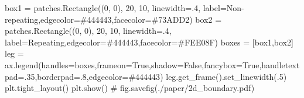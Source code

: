 \documentclass[
  letterpaper,
  DIV=11,
  numbers=noendperiod]{scrartcl}
\newenvironment{Shaded}{\begin{snugshade}}{\end{snugshade}}
\newcommand{\CommentTok}[1]{\textcolor[rgb]{0.37,0.37,0.37}{#1}}
\newcommand{\DecValTok}[1]{\textcolor[rgb]{0.68,0.00,0.00}{#1}}
\newcommand{\FloatTok}[1]{\textcolor[rgb]{0.68,0.00,0.00}{#1}}
\newcommand{\NormalTok}[1]{\textcolor[rgb]{0.00,0.23,0.31}{#1}}
\newcommand{\OperatorTok}[1]{\textcolor[rgb]{0.37,0.37,0.37}{#1}}
\newcommand{\StringTok}[1]{\textcolor[rgb]{0.13,0.47,0.30}{#1}}
\newcommand{\VariableTok}[1]{\textcolor[rgb]{0.07,0.07,0.07}{#1}}
\begin{document}
\begin{Shaded}
\begin{Highlighting}[]
\NormalTok{box1 }\OperatorTok{=}\NormalTok{ patches.Rectangle((}\DecValTok{0}\NormalTok{, }\DecValTok{0}\NormalTok{), }\DecValTok{20}\NormalTok{, }\DecValTok{10}\NormalTok{, linewidth}\OperatorTok{=}\FloatTok{.4}\NormalTok{, label}\OperatorTok{=}\StringTok{\textquotesingle{}Non{-}repeating\textquotesingle{}}\NormalTok{,edgecolor}\OperatorTok{=}\StringTok{\textquotesingle{}\#444443\textquotesingle{}}\NormalTok{,facecolor}\OperatorTok{=}\StringTok{\textquotesingle{}\#73ADD2\textquotesingle{}}\NormalTok{)}
\NormalTok{box2 }\OperatorTok{=}\NormalTok{ patches.Rectangle((}\DecValTok{0}\NormalTok{, }\DecValTok{0}\NormalTok{), }\DecValTok{20}\NormalTok{, }\DecValTok{10}\NormalTok{, linewidth}\OperatorTok{=}\FloatTok{.4}\NormalTok{, label}\OperatorTok{=}\StringTok{\textquotesingle{}Repeating\textquotesingle{}}\NormalTok{,edgecolor}\OperatorTok{=}\StringTok{\textquotesingle{}\#444443\textquotesingle{}}\NormalTok{,facecolor}\OperatorTok{=}\StringTok{\textquotesingle{}\#FEE08F\textquotesingle{}}\NormalTok{)}
\NormalTok{boxes }\OperatorTok{=}\NormalTok{ [box1,box2]}
\NormalTok{leg }\OperatorTok{=}\NormalTok{ ax.legend(handles}\OperatorTok{=}\NormalTok{boxes,frameon}\OperatorTok{=}\VariableTok{True}\NormalTok{,shadow}\OperatorTok{=}\VariableTok{False}\NormalTok{,fancybox}\OperatorTok{=}\VariableTok{True}\NormalTok{,handletextpad}\OperatorTok{=}\FloatTok{.35}\NormalTok{,borderpad}\OperatorTok{=}\FloatTok{.8}\NormalTok{,edgecolor}\OperatorTok{=}\StringTok{\textquotesingle{}\#444443\textquotesingle{}}\NormalTok{)}
\NormalTok{leg.get\_frame().set\_linewidth(}\FloatTok{.5}\NormalTok{)}
\NormalTok{plt.tight\_layout()}
\NormalTok{plt.show()}
\CommentTok{\# fig.savefig(\textquotesingle{}./paper/2d\_boundary.pdf\textquotesingle{})}
\end{Highlighting}
\end{Shaded}
\end{document}
